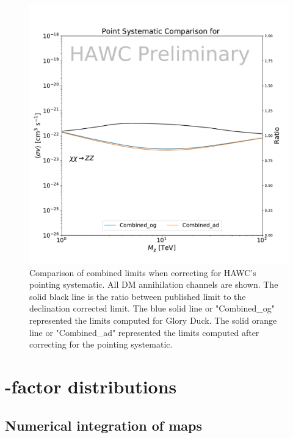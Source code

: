\begin{figure}[h]
{    \includegraphics[scale=0.21]{figures/glory_duck/hawc/PointingSystematic_GD_Combined_zz.pdf}
    \caption{Comparison of combined limits when correcting for HAWC's pointing systematic. All DM annihilation channels are shown. The solid black line is the ratio between published limit to the declination corrected limit. The blue solid line or "Combined\_og" represented the limits computed for Glory Duck. The solid orange line or "Combined\_ad" represented the limits computed after correcting for the pointing systematic.}
}
\label{fig:pointing_systematic}
\end{figure}

\section{\J-factor distributions}\label{sec:gd_jfactor_systematic}

\subsection{Numerical integration of \GS maps}\label{sec:gd_jfacintegration}

